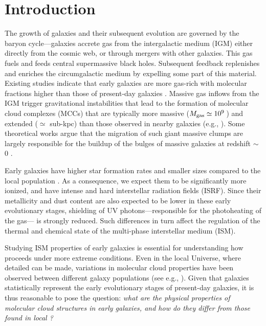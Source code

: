 \IfFileExists{emulateapjlegacy.cls}{\documentclass[iop]{emulateapjlegacy}}{\documentclass[iop]{emulateapj}}
\begin{document}

\section{Introduction}
The growth of galaxies and their subsequent evolution are governed by the baryon cycle---galaxies accrete gas from the intergalactic medium (IGM) either directly from the cosmic web, or through mergers with other galaxies. This gas fuels \SF and feeds central supermassive black holes. Subsequent feedback replenishes and enriches the circumgalactic medium by expelling some
part of this material.
%
Existing studies indicate that early galaxies are more gas-rich with molecular fractions higher than those of present-day galaxies \citep[e.g.,][]{vandevoort11b, Decarli16a, Decarli17a}. Massive gas inflows from the IGM trigger gravitational instabilities that lead to the formation of molecular cloud complexes (MCCs) that are typically more massive ($M_{\rm gas}\simeq 10^9$\,\Msun) and extended ($\simeq$ sub-kpc) than those observed in nearby galaxies (e.g., \citealt{Gabor13a, Hopkins14a, Inoue16a}). Some theoretical works argue that the migration of such giant massive clumps are largely responsible for the buildup of the bulges of massive galaxies at redshift \z$\sim$\,0 \citep[e.g.,][]{Ceverino10a}.

Early galaxies have higher star formation rates \citep[SFR; ][]{Behroozi13b, Sparre15a, Maiolino15a, Dunlop17a} and smaller sizes \citep[e.g.,][]{Bouwens11a, Ono13a} compared to the local population \citep[see also a review by][]{Stark16a}.
%
As a consequence, we expect them to be significantly more ionized, and have intense and hard interstellar radiation fields (ISRF). Since their metallicity and dust content are also expected to be lower in these early evolutionary stages, shielding of UV photons---responsible for the photoheating of the gas---  is strongly reduced. Such differences in turn affect the regulation of the thermal and chemical state of the multi-phase interstellar medium (ISM). 

Studying ISM properties of early galaxies is essential for understanding how \SF proceeds under more extreme conditions.
Even in the local Universe, where detailed \obs can be made, variations in molecular cloud properties have been observed between different galaxy populations (see e.g., \citealt{Hughes10a, Hughes13b}).  Given that \highz galaxies statistically represent the early evolutionary stages of present-day galaxies, it is thus reasonable to pose the question: {\it what are the physical properties of molecular cloud structures in early galaxies, and how do they differ from those found in local \galpop?}
%
\end{document}
